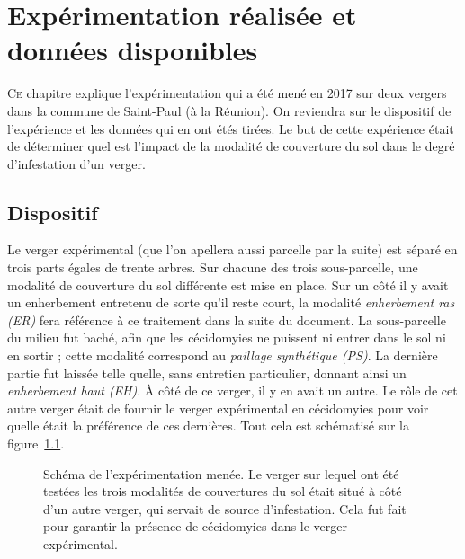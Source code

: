 \chapter{Expérimentation réalisée et données disponibles} 

\lettrine{C}{e} chapitre explique l'expérimentation qui a été mené en 2017 sur deux vergers dans la commune de Saint-Paul (à la Réunion). 
On reviendra sur le dispositif de l'expérience et les données qui en ont étés tirées.
Le but de cette expérience était de déterminer quel est l'impact de la modalité de couverture du sol dans le degré d'infestation d'un verger.


\section{Dispositif}

Le verger expérimental (que l'on apellera aussi parcelle par la suite) est séparé en trois parts égales de trente arbres.
Sur chacune des trois sous-parcelle, une modalité de couverture du sol différente est mise en place.
Sur un côté il y avait un enherbement entretenu de sorte qu'il reste court, la modalité \emph{enherbement ras (ER)} fera référence à ce traitement dans la suite du document.
La sous-parcelle du milieu fut baché, afin que les cécidomyies ne puissent ni entrer dans le sol ni en sortir ; cette modalité correspond au \emph{paillage synthétique (PS)}. 
La dernière partie fut laissée telle quelle, sans entretien particulier, donnant ainsi un \emph{enherbement haut (EH)}.
À côté de ce verger, il y en avait un autre. 
Le rôle de cet autre verger était de fournir le verger expérimental en cécidomyies pour voir quelle était la préférence de ces dernières.
Tout cela est schématisé sur la figure~\ref{fig:exp}.
\begin{figure}[ht]
 \centering
 \caption{Schéma de l'expérimentation menée. Le verger sur lequel ont été testées les trois modalités de couvertures du sol était situé à côté d'un autre verger, qui servait de source d'infestation. Cela fut fait pour garantir la présence de cécidomyies dans le verger expérimental.}
 \label{fig:exp}
\end{figure}

